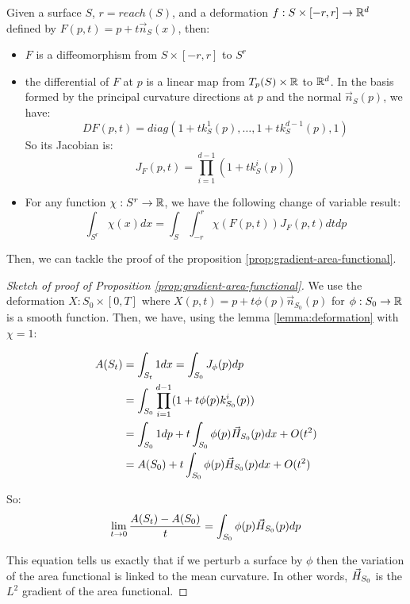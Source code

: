 \begin{lemma}
    \label{lemma:diffeo}

    Given a surface $ S $, $ r = reach(S) $, and a deformation $ f : S \times
    [-r, r] \to \mathbb{R}^d $ defined by $ F(p, t) = p + t \vec{n}_S(x) $, then:

    \begin{itemize}
        \item $ F $ is a diffeomorphism from $ S \times [-r, r] $ to $ S^r $
        \item the differential of $ F $ at $ p $ is a linear map from $ T_p(S)
            \times \mathbb{R} $ to $ \mathbb{R}^d $. In the basis formed by the principal
            curvature directions at $ p $ and the normal $ \vec{n}_S(p) $, we have:
            \begin{equation}
                D F(p, t) = diag(1 + t k^1_S(p), \ldots, 1 + t k^{d-1}_S(p), 1)
            \end{equation}
            So its Jacobian is:
            \begin{equation}
                J_F(p, t) = \prod_{i=1}^{d-1} (1 + t k^i_S(p))
            \end{equation}
        \item For any function $ \chi : S^r \to \mathbb{R} $, we have the following
            change of variable result:
            \begin{equation}
                \int_{S^r} \chi(x) dx = \int_S \int_{-r}^r \chi(F(p, t)) J_F(p,
                t) dt dp
            \end{equation}
    \end{itemize}
\end{lemma}

Then, we can tackle the proof of the proposition
\ref{prop:gradient-area-functional}.

\begin{proof}[Sketch of proof of Proposition \ref{prop:gradient-area-functional}]
    We use the deformation $ X : S_0 \times [0, T] $ where $ X(p, t) = p + t
    \phi(p) \vec{n}_{S_0}(p) $ for $ \phi : S_0 \to \mathbb{R} $ is a smooth
    function. Then, we have, using the lemma \ref{lemma:deformation} with $ \chi
    = 1 $:

    \begin{align*}
        A(S_t) &= \int_{S_t} 1 dx = \int_{S_0} J_{\phi}(p) dp \\
        &= \int_{S_0} \prod_{i=1}^{d-1} (1 + t \phi(p) k^i_{S_0}(p)) \\
        &= \int_{S_0} 1 dp + t \int_{S_0} \phi(p) \vec{H}_{S_0}(p) dx + O(t^2) \\
        &= A(S_0) + t \int_{S_0} \phi(p) \vec{H}_{S_0}(p) dx + O(t^2)
    \end{align*}

    So:
    $$ \lim\limits_{t \to 0} \frac{A(S_t) - A(S_0)}{t}= \int_{S_0}
    \phi(p) \vec{H}_{S_0}(p) dp $$

    This equation tells us exactly that if we perturb a surface by $ \phi $
    then the variation of the area functional is linked to the mean curvature.
    In other words, $ \vec{H}_{S_0} $ is the $ L^2 $ gradient of the area
    functional.
\end{proof}

